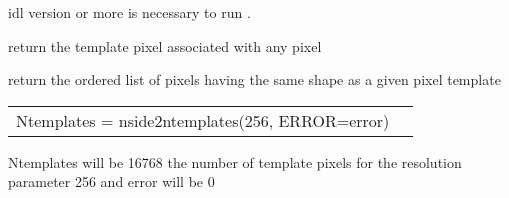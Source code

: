 \begin{related}
  \begin{sulist}{} %
    \item[idl] version \idlversion or more is necessary to run \facname.	
  \item[\htmlref{template\_pixel\_ring}{idl:template_pixel_xxx}]
  \item[\htmlref{template\_pixel\_nest}{idl:template_pixel_xxx}] return the
  template pixel associated with any \healpix pixel
  \item[\htmlref{same\_shape\_pixels\_ring}{idl:same_shape_pixels_xxx}] 
  \item[\htmlref{same\_shape\_pixels\_nest}{idl:same_shape_pixels_xxx}] 
  return
  the ordered list of pixels having the same shape as a given pixel template
  \end{sulist}
\end{related}

\begin{example}
{
\begin{tabular}{ll} %
Ntemplates = nside2ntemplates(256, ERROR=error)
\end{tabular}
}
{
Ntemplates will be 16768 the number of template pixels for the \healpix
resolution parameter 256 and error will be 0}
\end{example}

